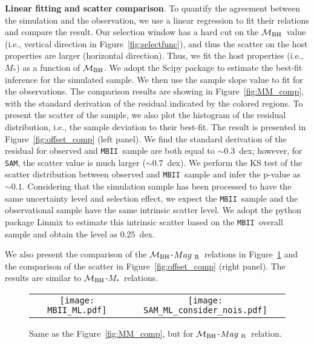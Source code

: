 \documentclass{natureprintstyle}
\newcommand{\mbh}{$\mathcal M_{\rm BH}$}
\newcommand{\mr}{$Mag_{\rm ~R}$}
\newcommand{\mstar}{{$M_*$}}
\newcommand{\sam}{\texttt{SAM}}
\newcommand{\mbii}{\texttt{MBII}}
\begin{document}
\textbf{Linear fitting and scatter comparison}.  
To quantify the agreement between the simulation and the observation, we use a linear regression to fit their relations and compare the result. Our selection window has a hard cut on the \mbh\ value (i.e., vertical direction in Figure~\ref{fig:selectfunc}), and thus the scatter on the host properties are larger (horizontal direction). Thus, we fit the host properties (i.e., \mstar) as a function of \mbh. We adopt the {\sc Scipy} package to estimate the best-fit inference for the simulated sample. We then use the sample slope value to fit for the observations. The comparison results are showing in Figure~\ref{fig:MM_comp}, with the standard derivation of the residual indicated by the colored regions. To present the scatter of the sample, we also plot the histogram of the residual distribution, i.e., the sample deviation to their best-fit. The result is presented in Figure~\ref{fig:offset_comp} (left panel). We find the standard derivation of the residual for observed and \mbii\ sample are both equal to $\sim0.3$~dex; however, for \sam, the scatter value is much larger ($\sim0.7$~dex).  We perform the KS test of the scatter distribution between observed and \mbii\ sample and infer the p-value as $\sim0.1$. Considering that the simulation sample has been processed to have the same uncertainty level and selection effect, we expect the \mbii\ sample and the observational sample have the same intrinsic scatter level. We adopt the python package {\sc Linmix}\cite{Kelly2007} to estimate this intrinsic scatter based on the \mbii\ overall sample and obtain the level as $0.25$~dex.

We also present the comparison of the \mbh-\mr\ relations in Figure~\ref{fig:ML_comp} and the comparison of the scatter in Figure~\ref{fig:offset_comp} (right panel). The results are similar to \mbh-\mstar\ relations.

\begin{figure*}[t]%
\begin{tabular}{c c}
\texttt{[image: MBII\_ML.pdf]} &
\texttt{[image: SAM\_ML\_consider\_nois.pdf]} \\
\end{tabular}
\caption{Same as the Figure~\ref{fig:MM_comp}, but for \mbh-\mr\ relation.}
\label{fig:ML_comp}
\end{figure*}
\end{document}
